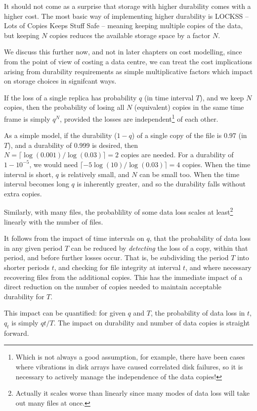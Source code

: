 It should not come as a surprise that storage with higher durability comes with
a higher cost.  The most basic way of implementing higher durability is LOCKSS --
Lots of Copies Keeps Stuff Safe -- meaning keeping multiple copies of the data,
but keeping $N$ copies reduces the available storage space by a factor $N$.

We discuss this further now, and not in later chapters on cost modelling, since
from the point of view of costing a data centre, we can treat the cost
implications arising from durability requirements as simple multiplicative
factors which impact on storage choices in signifcant ways.

If the loss of a single replica has probability $q$ (in time interval $T$), and we keep $N$ copies,
then the probability of losing all $N$ (equivalent) copies in the same time
frame is simply $q^N$, provided the losses are independent\footnote{Which
is not always a good assumption, for example,
there have been cases where vibrations in disk arrays have caused correlated
disk failures, so it is necessary to actively manage the independence
of the data copies!} of each other.

As a simple model, if the durability ($1-q$) of a single copy of the file is
$0.97$ (in $T$), and a durability of 0.999 is desired, then
$N=\lceil\log(0.001)/\log(0.03)\rceil=2$ copies are needed.
For a durability of $1-10^{-5}$, we would need
$\lceil-5\log(10)/\log(0.03)\rceil=4$ copies. When the time interval
is short, $q$ is relatively small, and $N$ can be small too. When the
time interval becomes long $q$ is inherently greater, and so the durability
falls without extra copies.

Similarly, with many files, the probablility of some data loss scales
at least\footnote{Actually it scales worse than linearly since
many modes of data loss will take out many files at once.} linearly with the
number of files.

It follows from the impact of time intervals on $q$, that the probability
of data loss in any given period $T$ can be reduced by \emph{detecting} the loss
of a copy, within that period, and before further losses occur. That is,
be subdividing the period $T$ into shorter periods $t$, and checking
for file integrity at interval $t$, and where necessary recovering files from
the additional copies.  This has the immediate impact of a direct reduction
on the number of copies needed to maintain acceptable durability for $T$.

This impact can be quantified: for given $q$ and $T$, the probability of
data loss in $t$, $q_t$ is simply $qt/T$. The impact on durability and number
of data copies is straight forward.

